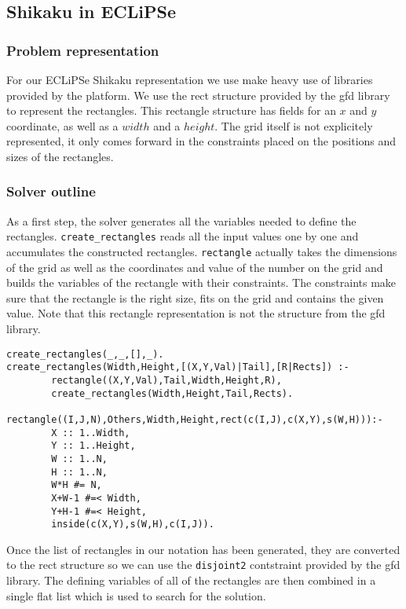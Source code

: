\subsection{Shikaku in ECLiPSe}
\subsubsection{Problem representation}
For our ECLiPSe Shikaku representation we use make heavy use of libraries provided by the platform. We use the rect structure provided by the gfd library to represent the rectangles. This rectangle structure has fields for an $x$ and $y$ coordinate, as well as a $width$ and a $height$. The grid itself is not explicitely represented, it only comes forward in the constraints placed on the positions and sizes of the rectangles.

\subsubsection{Solver outline}
As a first step, the solver generates all the variables needed to define the rectangles. \texttt{create\_rectangles} reads all the input values one by one and accumulates the constructed rectangles. \texttt{rectangle} actually takes the dimensions of the grid as well as the coordinates and value of the number on the grid and builds the variables of the rectangle with their constraints. The constraints make sure that the rectangle is the right size, fits on the grid and contains the given value. Note that this rectangle representation is not the structure from the gfd library.
\begin{lstlisting}
create_rectangles(_,_,[],_).
create_rectangles(Width,Height,[(X,Y,Val)|Tail],[R|Rects]) :-
        rectangle((X,Y,Val),Tail,Width,Height,R),
        create_rectangles(Width,Height,Tail,Rects).

rectangle((I,J,N),Others,Width,Height,rect(c(I,J),c(X,Y),s(W,H))):-
        X :: 1..Width,
        Y :: 1..Height,
        W :: 1..N,
        H :: 1..N,
        W*H #= N,
        X+W-1 #=< Width,
        Y+H-1 #=< Height,
        inside(c(X,Y),s(W,H),c(I,J)).
\end{lstlisting}

Once the list of rectangles in our notation has been generated, they are converted to the rect structure so we can use the \texttt{disjoint2} contstraint provided by the gfd library. The defining variables of all of the rectangles are then combined in a single flat list which is used to search for the solution.

